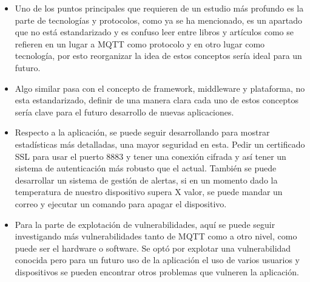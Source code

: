 {\begin{itemize}
    \item Uno de los puntos principales que requieren de un estudio más profundo es la parte de tecnologías y protocolos, como ya se ha mencionado, es un apartado que no está estandarizado y es confuso leer entre libros y artículos como se refieren en un lugar a MQTT como protocolo y en otro lugar como tecnología, por esto reorganizar la idea de estos conceptos sería ideal para un futuro.
    \item Algo similar pasa con el concepto de framework, middleware y plataforma, no esta estandarizado, definir de una manera clara cada uno de estos conceptos sería clave para el futuro desarrollo de nuevas aplicaciones.
    \item Respecto a la aplicación, se puede seguir desarrollando para mostrar estadísticas más detalladas, una mayor seguridad en esta. Pedir un certificado SSL para usar el puerto 8883 y tener una conexión cifrada y así tener un sistema de autenticación más robusto que el actual. También se puede desarrollar un sistema de gestión de alertas, si en un momento dado la temperatura de nuestro dispositivo supera X valor, se puede mandar un correo y ejecutar un comando para apagar el dispositivo.
    \item Para la parte de explotación de vulnerabilidades, aquí se puede seguir investigando más vulnerabilidades tanto de MQTT como a otro nivel, como puede ser el hardware o software. Se optó por explotar una vulnerabilidad conocida pero para un futuro uso de la aplicación el uso de varios usuarios y dispositivos se pueden encontrar otros problemas que vulneren la aplicación.
\end{itemize}

}